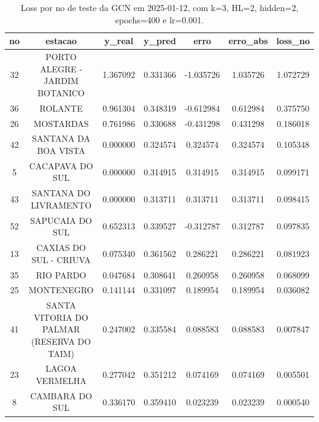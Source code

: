 \begin{table}[h]
\centering
\caption{Loss por no de teste da GCN em 2025-01-12, com k=3, HL=2, hidden=2, epochs=400 e lr=0.001.}
\label{tab:gcn_loss_k3_hl2_h2_e400_d20250112}
\begin{tabular}{ccccccc}
\toprule
no & estacao & y\_real & y\_pred & erro & erro\_abs & loss\_no \\
\midrule
32 & PORTO ALEGRE - JARDIM BOTANICO & 1.367092 & 0.331366 & -1.035726 & 1.035726 & 1.072729 \\
36 & ROLANTE & 0.961304 & 0.348319 & -0.612984 & 0.612984 & 0.375750 \\
26 & MOSTARDAS & 0.761986 & 0.330688 & -0.431298 & 0.431298 & 0.186018 \\
42 & SANTANA DA BOA VISTA & 0.000000 & 0.324574 & 0.324574 & 0.324574 & 0.105348 \\
5 & CACAPAVA DO SUL & 0.000000 & 0.314915 & 0.314915 & 0.314915 & 0.099171 \\
43 & SANTANA DO LIVRAMENTO & 0.000000 & 0.313711 & 0.313711 & 0.313711 & 0.098415 \\
52 & SAPUCAIA DO SUL & 0.652313 & 0.339527 & -0.312787 & 0.312787 & 0.097835 \\
13 & CAXIAS DO SUL - CRIUVA & 0.075340 & 0.361562 & 0.286221 & 0.286221 & 0.081923 \\
35 & RIO PARDO & 0.047684 & 0.308641 & 0.260958 & 0.260958 & 0.068099 \\
25 & MONTENEGRO & 0.141144 & 0.331097 & 0.189954 & 0.189954 & 0.036082 \\
41 & SANTA VITORIA DO PALMAR (RESERVA DO TAIM) & 0.247002 & 0.335584 & 0.088583 & 0.088583 & 0.007847 \\
23 & LAGOA VERMELHA & 0.277042 & 0.351212 & 0.074169 & 0.074169 & 0.005501 \\
8 & CAMBARA DO SUL & 0.336170 & 0.359410 & 0.023239 & 0.023239 & 0.000540 \\
\bottomrule
\end{tabular}
\end{table}

